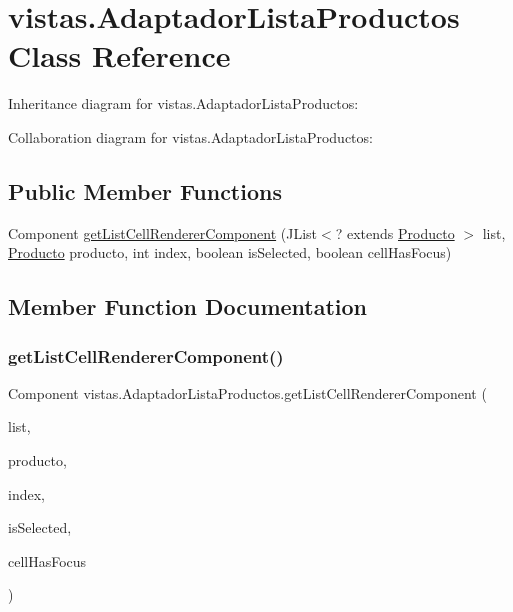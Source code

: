\hypertarget{classvistas_1_1_adaptador_lista_productos}{}\section{vistas.\+Adaptador\+Lista\+Productos Class Reference}
\label{classvistas_1_1_adaptador_lista_productos}


Inheritance diagram for vistas.\+Adaptador\+Lista\+Productos\+:


Collaboration diagram for vistas.\+Adaptador\+Lista\+Productos\+:
\subsection*{Public Member Functions}
\begin{DoxyCompactItemize}
\item 
Component \mbox{\hyperlink{classvistas_1_1_adaptador_lista_productos_a11ec1a4af03c0af6d15446b47338dd9d}{get\+List\+Cell\+Renderer\+Component}} (J\+List$<$? extends \mbox{\hyperlink{class_productos_1_1_producto}{Producto}} $>$ list, \mbox{\hyperlink{class_productos_1_1_producto}{Producto}} producto, int index, boolean is\+Selected, boolean cell\+Has\+Focus)
\end{DoxyCompactItemize}


\subsection{Member Function Documentation}
\mbox{\label{classvistas_1_1_adaptador_lista_productos_a11ec1a4af03c0af6d15446b47338dd9d}} 
\subsubsection{\texorpdfstring{get\+List\+Cell\+Renderer\+Component()}{getListCellRendererComponent()}}
{\footnotesize\ttfamily Component vistas.\+Adaptador\+Lista\+Productos.\+get\+List\+Cell\+Renderer\+Component (\begin{DoxyParamCaption}\item[{J\+List$<$? extends \mbox{\hyperlink{class_productos_1_1_producto}{Producto}} $>$}]{list,  }\item[{\mbox{\hyperlink{class_productos_1_1_producto}{Producto}}}]{producto,  }\item[{int}]{index,  }\item[{boolean}]{is\+Selected,  }\item[{boolean}]{cell\+Has\+Focus }\end{DoxyParamCaption})\hspace{0.3cm}{\ttfamily [inline]}}

